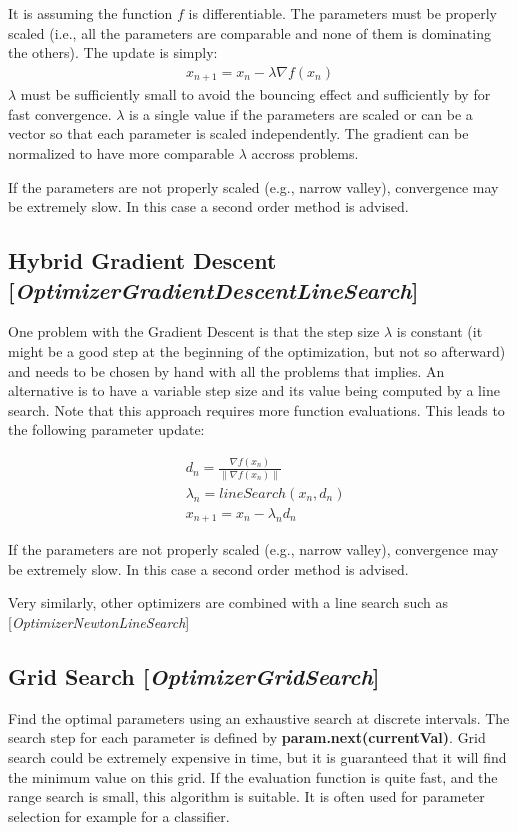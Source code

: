 \documentclass[11pt]{article}
\newcommand{\nllref}[1]{[\small{\textit{#1}}]}
\begin{document}
It is assuming the function $f$ is differentiable. The parameters must be properly scaled (i.e., all the parameters are comparable and none of them is dominating the others). The update is simply:
\begin{align}
x_{n+1} = x_n - \lambda \nabla{f}(x_n) \label{gradientstep}
\end{align}
$\lambda$ must be sufficiently small to avoid the bouncing effect and sufficiently by for fast convergence. $\lambda$ is a single value if the parameters are scaled or can be a vector so that each parameter is scaled independently. The gradient can be normalized to have more comparable $\lambda$ accross problems.

If the parameters are not properly scaled (e.g., narrow valley), convergence may be extremely slow. In this case a second order method is advised.

\subsection{Hybrid Gradient Descent \nllref{OptimizerGradientDescentLineSearch}}
One problem with the Gradient Descent is that the step size $\lambda$ is constant (it might be a good step at the beginning of the optimization, but not so afterward) and needs to be chosen by hand with all the problems that implies. An alternative is to have a variable step size and its value being computed by a line search. Note that this approach requires more function evaluations. This leads to the following parameter update:

\begin{align}
& d_n = \frac{\nabla{f}(x_n)}{\lVert \nabla{f}(x_n) \lVert} \nonumber\\
& \lambda_n = lineSearch(x_n, d_n) \nonumber\\
& x_{n+1} = x_n - \lambda _n d_n
\end{align}

If the parameters are not properly scaled (e.g., narrow valley), convergence may be extremely slow. In this case a second order method is advised.

Very similarly, other optimizers are combined with a line search such as
\nllref{OptimizerNewtonLineSearch}

\subsection{Grid Search \nllref{OptimizerGridSearch}}
Find the optimal parameters using an exhaustive search at discrete intervals. The search step for each parameter is defined
by \textbf{param.next(currentVal)}. Grid search could be extremely expensive in time, but it is guaranteed that it will find the minimum
value on this grid. If the evaluation function is quite fast, and the range search is small, this algorithm is suitable. It is often used for parameter selection for example for a classifier.
\end{document}
